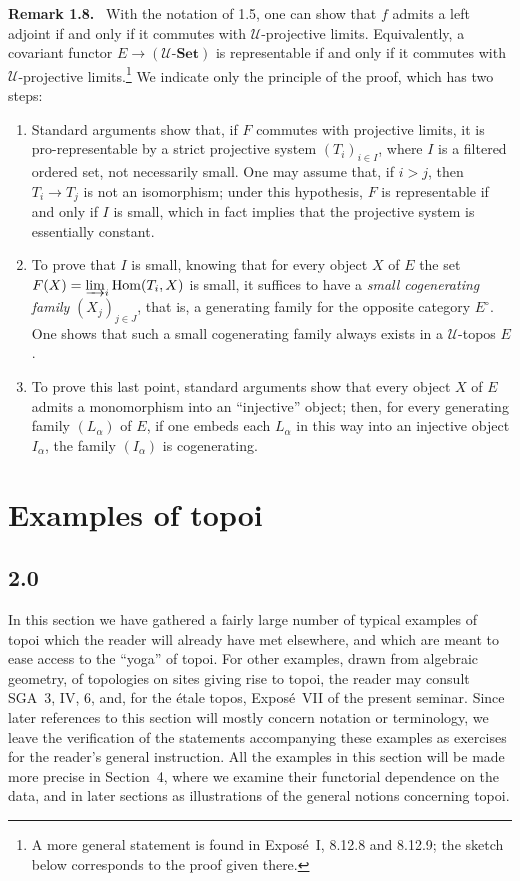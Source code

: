 \documentclass[11pt]{article}
\newcommand{\U}{\mathcal{U}}
\newcommand{\Set}{\mathbf{Set}}
\newcommand{\Hom}{\operatorname{Hom}}
\newenvironment{remarktext}[1]{\par\medskip\noindent\textbf{#1.}\ }{\par\medskip}
\begin{document}
\begin{remarktext}{Remark 1.8}
With the notation of 1.5, one can show that \(f\) admits a left adjoint if and only if it commutes with \(\U\)-projective limits. Equivalently, a covariant functor \(E\to(\U\text{-}\Set)\) is representable if and only if it commutes with \(\U\)-projective limits.\footnote{A more general statement is found in Expos\'e~I, 8.12.8 and 8.12.9; the sketch below corresponds to the proof given there.} We indicate only the principle of the proof, which has two steps:
\begin{enumerate}[label=\alph*)]
\item Standard arguments show that, if \(F\) commutes with projective limits, it is pro-representable by a strict projective system \((T_i)_{i\in I}\), where \(I\) is a filtered ordered set, not necessarily small. One may assume that, if \(i>j\), then \(T_i\to T_j\) is not an isomorphism; under this hypothesis, \(F\) is representable if and only if \(I\) is small, which in fact implies that the projective system is essentially constant.
\item To prove that \(I\) is small, knowing that for every object \(X\) of \(E\) the set \(F(X)=\varinjlim_i\Hom(T_i,X)\) is small, it suffices to have a \emph{small cogenerating family} \((X_j)_{j\in J}\), that is, a generating family for the opposite category \(E^\circ\). One shows that such a small cogenerating family always exists in a \(\U\)-topos \(E\).
\item To prove this last point, standard arguments show that every object \(X\) of \(E\) admits a monomorphism into an ``injective'' object; then, for every generating family \((L_\alpha)\) of \(E\), if one embeds each \(L_\alpha\) in this way into an injective object \(I_\alpha\), the family \((I_\alpha)\) is cogenerating.
\end{enumerate}
\end{remarktext}

\section{Examples of topoi}

\subsection*{2.0}
In this section we have gathered a fairly large number of typical examples of topoi which the reader will already have met elsewhere, and which are meant to ease access to the ``yoga'' of topoi. For other examples, drawn from algebraic geometry, of topologies on sites giving rise to topoi, the reader may consult SGA~3, IV, 6, and, for the \'etale topos, Expos\'e~VII of the present seminar. Since later references to this section will mostly concern notation or terminology, we leave the verification of the statements accompanying these examples as exercises for the reader's general instruction. All the examples in this section will be made more precise in Section~4, where we examine their functorial dependence on the data, and in later sections as illustrations of the general notions concerning topoi.
\end{document}
